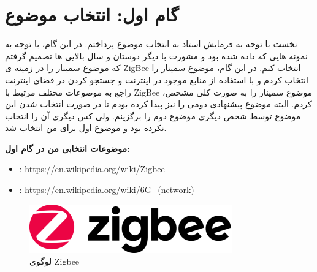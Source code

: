 \def \Subject {گام اول: انتخاب موضوع}
\section{\Subject}
نخست با توجه به فرمایش استاد به انتخاب موضوع پرداختم.
در این گام، با توجه به نمونه هایی که داده شده بود و مشورت با دیگر دوستان و سال بالایی ها 
تصمیم گرفتم که موضوع سمینار را در زمینه ی 
ZigBee
انتخاب کنم.
در این گام، موضوع سمینار را انتخاب کردم و با استفاده از منابع موجود در اینترنت و جستجو کردن در فضای اینترنت 
راجع به موضوعات مختلف مرتبط با 
ZigBee
،موضوع سمینار را به صورت کلی مشخص کردم.
البته  موضوع پیشنهادی دومی را نیز پیدا کرده بودم تا در صورت انتخاب شدن این موضوع توسط شخص دیگری موضوع دوم را برگزینم.
ولی کس دیگری آن را انتخاب نکرده بود و  موضوع اول برای من انتخاب شد.

\textbf{موضوعات انتخابی من در گام اول:}
\begin{itemize}
    \item {}  : \url{https://en.wikipedia.org/wiki/Zigbee}
    \item {} : \url{https://en.wikipedia.org/wiki/6G_(network)}
\end{itemize}

\begin{figure}[H]
    \centering
    \includegraphics[width=0.65\linewidth]{images/Zigbee_logo.png}
    \caption{ لوگوی Zigbee }
    \label{fig:h}
\end{figure}